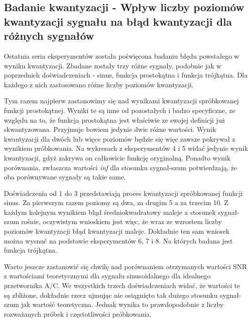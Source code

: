 \documentclass[12pt]{article}
\begin{document}
{{        }

        \subsection{Badanie kwantyzacji - Wpływ liczby poziomów kwantyzacji sygnału na błąd
        kwantyzacji dla różnych sygnałów} {
        Ostatnia seria eksperymentów została poświęcona
        badaniu błędu powstałego w wyniku kwantyzacji.
        Zbadane zostały trzy różne sygnały, podobnie jak
        w poprzednich doświadczeniach - sinus, funkcja
        prostokątna i funkcja trójkątna. Dla każdego z
        nich zastosowano różne liczby poziomów
        kwantyzacji.

        Tym razem najpierw zastanowimy się nad wynikami
        kwantyzacji spróbkowanej funkcji prostokątnej.
        Wyniki te są inne od pozostałych i badzo
        specyficzne, ze względu na to, że funkcja
        prostokątna jest właściwie ze swojej definicji
        już skwantyzowana. Przyjmuje bowiem jedynie dwie
        różne wartości. Wynik kwantyzacji dla dwóch lub
        więce poziomów będzie się więc zawsze pokrywał z
        wynikiem próbkowania. Na wykresach z
        eksperymentów 4 i 5 widać jedynie wynik
        kwantyzacji, gdyż zakrywa on całkowicie funkcję
        oryginalną. Ponadto wynik porównania, zwłaszcza
        wartości \emph{inf} dla stosunku sygnał-szum
        potwierdzają, że oba porównywane sygnały są
        takie same.

        Doświadczenia od 1 do 3 przedstawiają proces
        kwantyzacji spróbkowanej funkcji sinus. Za
        pierwszym razem poziomy są dwa, za drugim 5 a za
        trzecim 10. Z każdym kolejnym wynikiem błąd
        średniokwadratowy maleje a stosunek sygnał-szum
        rośnie, oczywistym wnioskiem jest więc, że wraz
        ze wzrostem liczby poziomów kwantyzacji błąd
        kwantyzacji maleje. Dokładnie ten sam wniosek
        można wysnuć na podstawie eksperymentów 6, 7 i
        8. Na których badana jest funkcja trójkątna.

        Warto jeszcze zastanowić się chwilę nad
        porównaniem otrzymanych wartości SNR z
        wartościami teoretycznymi dla sygnału
        sinusoidalnego dla idealnego przetwornika A/C.
        We wszystkich trzech doświadczeniach widać, że
        wartości te są zbliżone, dokładnie rzecz ujmując
        nie osiągnięto tak dużego stosunku sygnał-szum
        jak wartość teoretyczna. Jednak wynika to
        prawdopodobnie z liczby rozważanych próbek i
        częstotliwości próbkowania.
        }

    }
\end{document}
